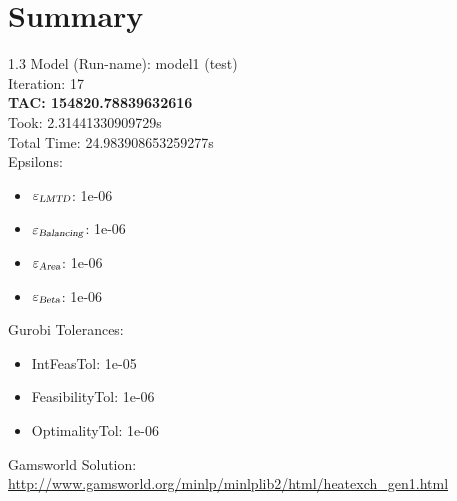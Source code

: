 \documentclass{article}%
\begin{document}
%
\normalsize%
\section{Summary}%
\thispagestyle{plain}%
\begin{spacing}{1.3}%
\Large%
Model (Run-name): model1 (test)\\%
Iteration: 17\\%
\textbf{TAC: 154820.78839632616}\\%
Took: 2.31441330909729s\\%
Total Time: 24.983908653259277s\\%
Epsilons:%
\begin{itemize}%
	\item $\varepsilon_{\textsl{LMTD}}$: 1e-06%
	\item $\varepsilon_{\textsl{Balancing}}$: 1e-06%
	\item $\varepsilon_{\textsl{Area}}$: 1e-06%
	\item $\varepsilon_{\textsl{Beta}}$: 1e-06%
\end{itemize}%
Gurobi Tolerances:%
\begin{itemize}%
	\item IntFeasTol: 1e-05%
	\item FeasibilityTol: 1e-06%
	\item OptimalityTol: 1e-06%
\end{itemize}%
\end{spacing}%
\normalsize%
Gamsworld Solution: \url{http://www.gamsworld.org/minlp/minlplib2/html/heatexch_gen1.html}%
%
\clearpage%
\end{document}
